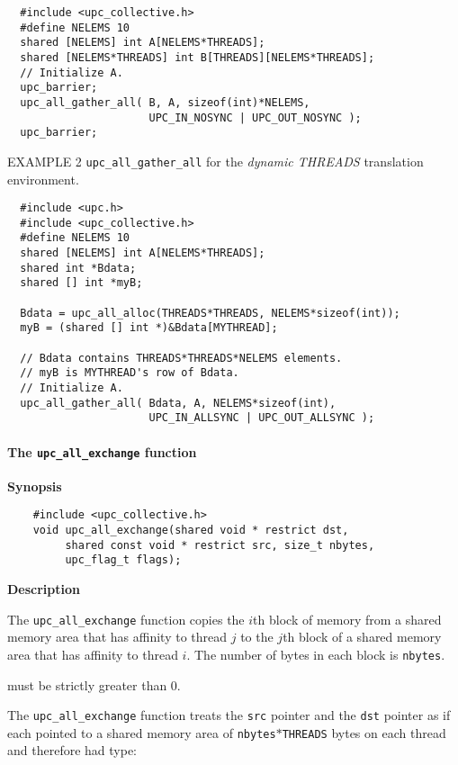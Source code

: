 \begin{verbatim}
  #include <upc_collective.h>
  #define NELEMS 10
  shared [NELEMS] int A[NELEMS*THREADS];
  shared [NELEMS*THREADS] int B[THREADS][NELEMS*THREADS];
  // Initialize A.
  upc_barrier;
  upc_all_gather_all( B, A, sizeof(int)*NELEMS,
                      UPC_IN_NOSYNC | UPC_OUT_NOSYNC );
  upc_barrier;
\end{verbatim}

\np EXAMPLE 2 {\tt upc\_all\_gather\_all} for the {\em dynamic THREADS}
translation environment.

\begin{verbatim}
  #include <upc.h>
  #include <upc_collective.h>
  #define NELEMS 10
  shared [NELEMS] int A[NELEMS*THREADS];
  shared int *Bdata;
  shared [] int *myB;

  Bdata = upc_all_alloc(THREADS*THREADS, NELEMS*sizeof(int));
  myB = (shared [] int *)&Bdata[MYTHREAD];

  // Bdata contains THREADS*THREADS*NELEMS elements.
  // myB is MYTHREAD's row of Bdata.
  // Initialize A.
  upc_all_gather_all( Bdata, A, NELEMS*sizeof(int),
                      UPC_IN_ALLSYNC | UPC_OUT_ALLSYNC );
\end{verbatim}

\paragraph{The {\tt upc\_all\_exchange} function}

{\bf Synopsis} 

\npf\vspace{-2.5em}
\begin{verbatim}
    #include <upc_collective.h>
    void upc_all_exchange(shared void * restrict dst, 
         shared const void * restrict src, size_t nbytes,
         upc_flag_t flags);
\end{verbatim}

{\bf Description} 

\np The {\tt upc\_all\_exchange} function copies the $i$th block of memory
from a shared memory area that has affinity to thread $j$ to the $j$th block
of a shared memory area that has affinity to thread $i$.
The number of bytes in each block is {\tt nbytes}.

 must be strictly greater than 0.

\np The {\tt upc\_all\_exchange} function treats the {\tt src} pointer
and the {\tt dst} pointer as if each
pointed to a shared memory area of {\tt nbytes}$*${\tt THREADS} bytes
on each thread and therefore had type:

